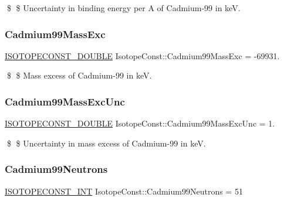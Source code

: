 \$ \$ Uncertainty in binding energy per A of Cadmium-\/99 in keV. \mbox{\label{group___isotope_const-_cadmium-_cd99_gacd1e4889f197adf8d5d63014fe8d6b89}} 
\subsubsection{\texorpdfstring{Cadmium99\+Mass\+Exc}{Cadmium99MassExc}}
{\footnotesize\ttfamily \mbox{\hyperlink{group___isotope_const-_macros_ga8f45a7272ce02c0b4c65c44636ed719a}{I\+S\+O\+T\+O\+P\+E\+C\+O\+N\+S\+T\+\_\+\+D\+O\+U\+B\+LE}} Isotope\+Const\+::\+Cadmium99\+Mass\+Exc = -\/69931.}

\$ \$ Mass excess of Cadmium-\/99 in keV. \mbox{\label{group___isotope_const-_cadmium-_cd99_ga92405a391fea4ecb6b27c4943ea6c51c}} 
\subsubsection{\texorpdfstring{Cadmium99\+Mass\+Exc\+Unc}{Cadmium99MassExcUnc}}
{\footnotesize\ttfamily \mbox{\hyperlink{group___isotope_const-_macros_ga8f45a7272ce02c0b4c65c44636ed719a}{I\+S\+O\+T\+O\+P\+E\+C\+O\+N\+S\+T\+\_\+\+D\+O\+U\+B\+LE}} Isotope\+Const\+::\+Cadmium99\+Mass\+Exc\+Unc = 1.}

\$ \$ Uncertainty in mass excess of Cadmium-\/99 in keV. \mbox{\label{group___isotope_const-_cadmium-_cd99_ga234ec942cc9521a32418a244d256c130}} 
\subsubsection{\texorpdfstring{Cadmium99\+Neutrons}{Cadmium99Neutrons}}
{\footnotesize\ttfamily \mbox{\hyperlink{group___isotope_const-_macros_ga5f18360b3e99483a35c32d789e62621c}{I\+S\+O\+T\+O\+P\+E\+C\+O\+N\+S\+T\+\_\+\+I\+NT}} Isotope\+Const\+::\+Cadmium99\+Neutrons = 51}

